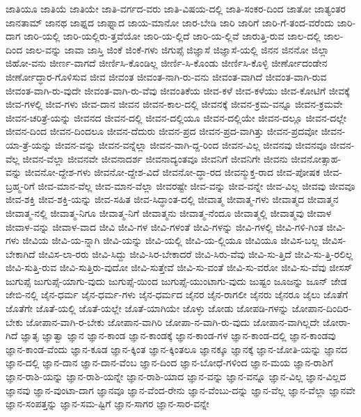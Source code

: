 {ಜಾತಿಯೂ
ಜಾತಿಯೆ
ಜಾತಿಯೇ
ಜಾತಿ-ವರ್ಗದ-ವರು
ಜಾತಿ-ವಿಷಯ-ದಲ್ಲಿ
ಜಾತಿ-ಸಂಕರ-ದಿಂದ
ಜಾತೋ
ಜಾತ್ಯಂತರ
ಜಾನತಾಮ್
ಜಾನಥ
ಜಾಫ್ನದ
ಜಾಫ್ನಾದ
ಜಾಯ-ಮಾನೋ
ಜಾರ-ಬೇಡಿ
ಜಾರಿ
ಜಾರಿಗೆ
ಜಾರಿ-ಗೆ-ತಂದ-ವರೆಂದು
ಜಾರಿ-ದಾಗ
ಜಾರಿ-ಯಲ್ಲಿ
ಜಾರಿ-ಯಲ್ಲಿರು-ತ್ತವೆಯೋ
ಜಾರಿ-ಯ-ಲ್ಲಿದೆ
ಜಾರಿ-ಯ-ಲ್ಲಿವೆ
ಜಾರುತ್ತಿ-ರುವ
ಜಾಲ-ದಲ್ಲಿ
ಜಾಲ-ದಿಂದ
ಜಾಲ-ವನ್ನು
ಜಾವಾ
ಜಾಸ್ತಿ
ಜಿಂಕೆ
ಜಿಂಕೆ-ಗಳು
ಜಿಗುಪ್ಸೆ
ಜಿಜ್ಞಾಸೆ
ಜಿಜ್ಞಾಸೆ-ಯಲ್ಲಿ
ಜಿನನ
ಜಿನನೋ
ಜಿಲ್ಲಾ
ಜಿಹೋ-ವನು
ಜೀರ್ಣ-ವಾಗದೆ
ಜೀರ್ಣಿಸಿ-ಕೊಂಡಿಲ್ಲ
ಜೀರ್ಣಿ-ಸಿ-ಕೊಂಡು
ಜೀರ್ಣಿಸಿ-ಕೊಳ್ಳಿ
ಜೀರ್ಣೋದಂಡೇನ
ಜೀರ್ಣೋದ್ಧಾರ-ಗೊಳಿಸುವ
ಜೀವ
ಜೀವಂತ
ಜೀವಂತ-ನಾಗಿ-ರು-ವನು
ಜೀವಂತ-ವಾಗಿದೆ
ಜೀವಂತ-ವಾಗಿ-ರುವ
ಜೀವಂತ-ವಾಗಿ-ರು-ವುದೇ
ಜೀವಂತ-ವಾಗಿ-ರು-ವೆವು
ಜೀವಂತಿಕೆಯ
ಜೀವ-ಕಳೆ
ಜೀವ-ಕಳೆಯು
ಜೀವ-ಕೋಟಿಗೆ
ಜೀವಕ್ಕೆ
ಜೀವ-ಗಳಲ್ಲಿ
ಜೀವ-ಗಳು
ಜೀವ-ದಾನ
ಜೀವನ
ಜೀವನ-ಕಾಲ-ದಲ್ಲಿ
ಜೀವನಕ್ಕೆ
ಜೀವನ-ಕ್ರಮ-ವನ್ನೂ
ಜೀವನ-ಕ್ರಮವೇ
ಜೀವನ-ಚರಿತ್ರೆ-ಯನ್ನು
ಜೀವನದ
ಜೀವನ-ದಲ್ಲಿ
ಜೀವನ-ದಲ್ಲಿಯೂ
ಜೀವನ-ದಲ್ಲಿಯೇ
ಜೀವನ-ದಲ್ಲೂ
ಜೀವನ-ದಲ್ಲೇ
ಜೀವನ-ದಿಂದ
ಜೀವನ-ದಿಂದಲೂ
ಜೀವನ-ದೆದುರು
ಜೀವನ-ಪ್ರದ
ಜೀವನ-ಪ್ರದ-ವಾಗಿತ್ತು
ಜೀವನ-ಪ್ರದವೋ
ಜೀವನ-ಯಾ-ತ್ರೆ-ಯನ್ನು
ಜೀವನ-ವನ್ನು
ಜೀವನ-ವನ್ನೆಲ್ಲಾ
ಜೀವನ-ವಾಗಿ-ದ್ದ-ರಿಂದ
ಜೀವನ-ವಿಲ್ಲ
ಜೀವನವು
ಜೀವನವೂ
ಜೀವನ-ವೆಲ್ಲ
ಜೀವನ-ವೆಲ್ಲಾ
ಜೀವನವೇ
ಜೀವನಾದರ್ಶ
ಜೀವನಾದ್ಯಂತವೂ
ಜೀವನಿಗೆ
ಜೀವನಿಗೇ
ಜೀವನು
ಜೀವನೋತ್ಸಾಹ-ವನ್ನು
ಜೀವನೋ-ದ್ದೇಶ-ಗಳು
ಜೀವನೋ-ದ್ದೇಶ-ವಿದೆ
ಜೀವನೋ-ದ್ಧಾ-ರದ
ಜೀವನ್ಮುಕ್ತ-ರಾದ
ಜೀವ-ಪೋಷಕ
ಜೀವ-ಬ್ರಹ್ಮ-ರಿಗೆ
ಜೀವ-ಮಾನ-ವೆಲ್ಲ
ಜೀವ-ಮಾನ-ವೆಲ್ಲಾ
ಜೀವರಷ್ಟೇ
ಜೀವ-ವನ್ನು
ಜೀವ-ವನ್ನೇ
ಜೀವ-ವಿಲ್ಲ
ಜೀವವು
ಜೀವವೂ
ಜೀವ-ಶಕ್ತಿ
ಜೀವ-ಶಕ್ತಿ-ಯನ್ನು
ಜೀವ-ಸಹಿತ
ಜೀವ-ಸಿದ್ಧಾಂತ-ದಲ್ಲಿ
ಜೀವಾತ್ಮ
ಜೀವಾತ್ಮ-ಗಳು
ಜೀವಾತ್ಮದ
ಜೀವಾತ್ಮನ
ಜೀವಾತ್ಮ-ನಲ್ಲಿ
ಜೀವಾತ್ಮ-ನಿಗೂ
ಜೀವಾತ್ಮ-ನಿಗೆ
ಜೀವಾತ್ಮನು
ಜೀವಾತ್ಮ-ನೆಂದೂ
ಜೀವಾತ್ಮಲ್ಲಿ
ಜೀವಾತ್ಮವು
ಜೀವಾಳ
ಜೀವಾಳ-ವನ್ನು
ಜೀವಾಳ-ವಾದ
ಜೀವಿ
ಜೀವಿ-ಗಳ
ಜೀವಿ-ಗಳಂತೆ
ಜೀವಿ-ಗಳನ್ನು
ಜೀವಿ-ಗಳಲ್ಲಿ
ಜೀವಿ-ಗಳಿ-ಗಿಂತ
ಜೀವಿ-ಗಳು
ಜೀವಿಯ
ಜೀವಿ-ಯ-ನ್ನಾಗಿ
ಜೀವಿ-ಯನ್ನು
ಜೀವಿ-ಯಲ್ಲಿ
ಜೀವಿ-ಯ-ಲ್ಲಿಯೂ
ಜೀವಿಯೂ
ಜೀವಿಸ-ಬಲ್ಲ
ಜೀವಿಸ-ಬೇಕಾಗಿದೆ
ಜೀವಿಸ-ಲಾ-ರರು
ಜೀವಿ-ಸಿದ್ದು
ಜೀವಿ-ಸಿರ-ಬೇಕಾದರೆ
ಜೀವಿ-ಸಿರು-ವೆವು
ಜೀವಿ-ಸು-ತ್ತಿದೆ
ಜೀವಿ-ಸು-ತ್ತಿ-ರಲಿಲ್ಲ
ಜೀವಿ-ಸುತ್ತಿ-ರುವ
ಜೀವಿ-ಸುತ್ತಿರು-ವುದೋ
ಜೀವಿ-ಸುತ್ತೇವೆ
ಜೀವಿ-ಸು-ವಂತೆ
ಜೀವಿ-ಸು-ವರೋ
ಜೀವಿ-ಸು-ವೆವು
ಜೀಸಸ್
ಜುಗುಪ್ಸೆ
ಜುಗುಪ್ಸೆ-ಯಾಗು-ವುದು
ಜುಗುಪ್ಸೆ-ಯಿಂದ
ಜುಗುಪ್ಸೆ-ಯುಂಟಾಗು-ವುದು
ಜುಷ್ಟಂ
ಜೂಜನ್ನು
ಜೂನ್
ಜೇಡ
ಜೇಬಿ-ನಲ್ಲಿ
ಜೈನ-ಧರ್ಮ
ಜೈನ-ಧರ್ಮ-ಗಳು
ಜೈನ-ಧರ್ಮದ
ಜೈನರ
ಜೈನ-ರಾಗಲೀ
ಜೈನರು
ಜೈನರೂ
ಜೈಲು
ಜೊತೆಗೆ
ಜೊತೆಗೇ
ಜೊತೆ-ಯಲ್ಲಿ
ಜೊತೆ-ಯಲ್ಲೇ
ಜೊತೆ-ಯಾಗಿಯೇ
ಜೊಳ್ಳು
ಜೋಡು
ಜೋಪಡಿ-ಗಳನ್ನು
ಜೋಪಾನ-ದಿಂದಿರ-ಬೇಕು
ಜೋಪಾನ-ವಾಗಿ-ರ-ಬೇಕು
ಜೋಪಾನ-ವಾಗಿರಿ
ಜೋಪಾ-ನ-ವಾಗಿ-ರು-ವುದು
ಜೋಪಾನ-ವಾಗಿಲ್ಲದೇ
ಜೋರಾ-ಗಿದೆ
ಜ್ಞಾತೃ
ಜ್ಞಾತ್ವಾ
ಜ್ಞಾನ
ಜ್ಞಾನ-ಕಾಂಡ
ಜ್ಞಾನ-ಕಾಂಡಕ್ಕೆ
ಜ್ಞಾನ-ಕಾಂಡ-ಗಳ
ಜ್ಞಾನ-ಕಾಂಡ-ದಲ್ಲಿ
ಜ್ಞಾನ-ಕಾಂಡವು
ಜ್ಞಾನ-ಕಾಂಡ-ವೆಂದು
ಜ್ಞಾನ-ಕೂಡ
ಜ್ಞಾನ-ಕ್ಕಿಂತ
ಜ್ಞಾನ-ಕ್ಕಿಂತಲೂ
ಜ್ಞಾನಕ್ಕೂ
ಜ್ಞಾನಕ್ಕೆ
ಜ್ಞಾನ-ಜೋತಿ-ಯನ್ನು
ಜ್ಞಾನದ
ಜ್ಞಾನ-ದಲ್ಲಿ
ಜ್ಞಾನ-ದಾನ
ಜ್ಞಾನ-ದಾನ-ವೆಂಬ
ಜ್ಞಾನ-ದಿಂದ
ಜ್ಞಾನ-ಬೋಧೆ-ಗಳಿಂದ
ಜ್ಞಾನ-ಮಯ
ಜ್ಞಾನ-ರಾಶಿಗೆ
ಜ್ಞಾನ-ರಾಶಿ-ಯನ್ನು
ಜ್ಞಾನ-ರಾಶಿ-ಯನ್ನೇ
ಜ್ಞಾನ-ರಾಶಿ-ಯಾದ
ಜ್ಞಾನ-ವನ್ನು
ಜ್ಞಾನ-ವನ್ನೂ
ಜ್ಞಾನ-ವಿಲ್ಲ
ಜ್ಞಾನ-ವಿಲ್ಲದ
ಜ್ಞಾನವು
ಜ್ಞಾನ-ವುಂಟಾ-ದಾಗ
ಜ್ಞಾನವೂ
ಜ್ಞಾನ-ವೆಂದ-ರೇನು
ಜ್ಞಾನ-ವೆಂಬು-ದನ್ನು
ಜ್ಞಾನ-ವೆಲ್ಲ
ಜ್ಞಾನ-ವೆಲ್ಲಾ
ಜ್ಞಾನವೇ
ಜ್ಞಾನ-ಸಂಪತ್ತನ್ನು
ಜ್ಞಾನ-ಸಮ-ಷ್ಟಿಗೆ
ಜ್ಞಾನ-ಸಾಗರ
ಜ್ಞಾನ-ಸಾರ-ವನ್ನೇ
}
